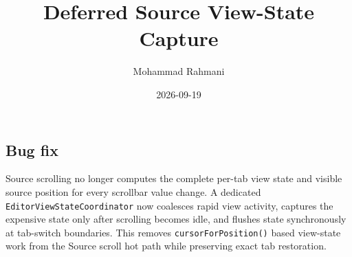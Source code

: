 \documentclass[a4paper]{article}
\title{Deferred Source View-State Capture}
\date{2026-09-19}
\author{Mohammad Rahmani}
\begin{document}
\maketitle

\begin{preview}
\section{Bug fix}

Source scrolling no longer computes the complete per-tab view state and visible
source position for every scrollbar value change. A dedicated
\texttt{EditorViewStateCoordinator} now coalesces rapid view activity, captures
the expensive state only after scrolling becomes idle, and flushes state
synchronously at tab-switch boundaries. This removes
\texttt{cursorForPosition()} based view-state work from the Source scroll hot
path while preserving exact tab restoration.

\end{preview}
\end{document}
